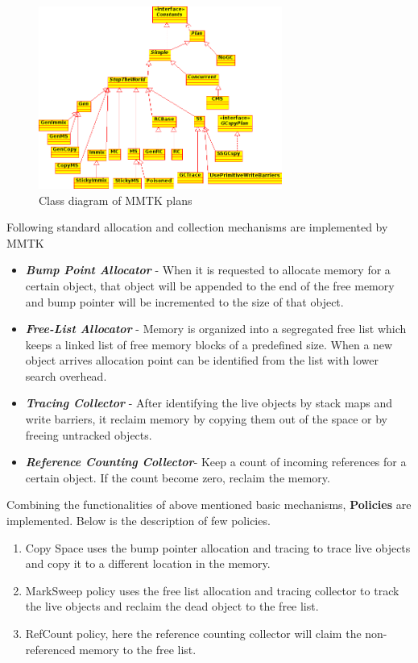 \begin{figure}[ht!]
\centering
\includegraphics[width=80mm]{Plan.png}
\caption{Class diagram of MMTK plans}
\label{fig:mmtk}
\end{figure}

Following standard allocation and collection mechanisms are implemented by MMTK

\begin{itemize}
 \item \emph{\textbf{Bump Point Allocator}} - When it is requested to allocate memory for a certain object, that object will be appended to the end of the free memory and bump pointer will be incremented to the size of that object.
 \item \emph{\textbf{Free-List Allocator}} - Memory is organized into a segregated free list which keeps a linked list of free memory blocks of a predefined size. When a new object arrives allocation point can be identified from the list with lower search overhead.
 \item \emph{\textbf{Tracing Collector}} - After identifying the live objects by stack maps and write barriers, it reclaim memory by copying them out of the space or by freeing untracked objects.
 \item \emph{\textbf{Reference Counting Collector}}- Keep a count of incoming references for a certain object. If the count become zero, reclaim the memory.
\end{itemize}

Combining the functionalities of above mentioned basic mechanisms, \textbf{Policies} are implemented. Below is the description of few policies.

\begin{enumerate}
 \item Copy Space uses the bump pointer allocation and tracing to trace live objects and copy it to a different location in the memory.
 \item MarkSweep policy uses the free list allocation and tracing collector to track the live objects and reclaim the dead object to the free list.
 \item RefCount policy, here the reference counting collector will claim the non-referenced memory to the free list.
\end{enumerate}

